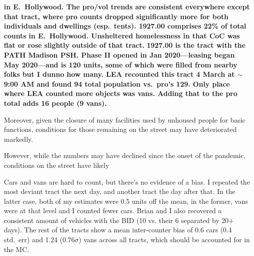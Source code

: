 \documentclass[11pt]{article}
\def\bfr{\bf\color{red}}
\begin{document}

{\bfr in E.\ Hollywood. The pro/vol trends are consistent everywhere except that tract, 
			where pro counts dropped significantly more for both individuals and dwellings (esp.\ 
			tents). 1927.00 comprises 22\% of total counts in E.~Hollywood. Unsheltered 
			homelessness in that CoC was flat or rose slightly outside of that tract.}
{\bfr 1927.00 is the tract with the PATH Madison PSH. Phase II opened in Jan 2020---leasing began May 
2020---and is 120 units, some of which were filled from nearby folks but I dunno how many. LEA recounted 
this tract 4 March at $\sim$9:00 AM and found 94 total population vs.\ pro's 129. Only place where
LEA counted more objects was vans. Adding that to the pro total adds 16 people (9 vans).}

Moreover, given the closure
of many facilities used by unhoused people for basic functions, conditions for those remaining on the street may
have deteriorated markedly. 

However, while the numbers may have declined since the onset of the pandemic, conditions on the street
have likely 


Cars and vans are hard to count, but there's no evidence of a bias. I repeated the most deviant tract the next day, 
and another tract the day after that. In the latter case, both of my estimates were 0.5 units off the mean, in the 
former, vans were at that level and I counted fewer cars. Brian and I also recovered a consistent amount of vehicles 
with the BID (10 vs. their 6 separated by 20+ days). The rest of the tracts show a mean inter-counter bias of 0.6 
cars (0.4 std.~err) and 1.24 ($0.76\sigma$) vans across all tracts, which should be accounted for in the MC.



%
\end{document}
